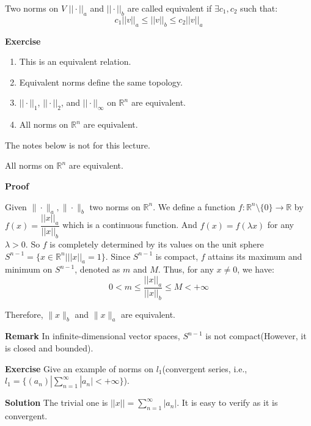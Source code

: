 \documentclass[main.tex]{subfiles}
\begin{document}
\begin{definition}
    Two norms on $V$ $||\cdot||_a$ and $||\cdot||_b$ are called equivalent if $\exists c_1, c_2$ such that:
    \begin{equation}
        c_1 ||v||_a \leq ||v||_b \leq c_2 ||v||_a
    \end{equation}
\end{definition}

\par \noindent \textbf{Exercise} 
\begin{enumerate}
    \item This is an equivalent relation.
    \item Equivalent norms define the same topology. 
    \item $||\cdot||_1$, $||\cdot||_2$, and $||\cdot||_\infty$ on $\mathbb{R}^n$ are equivalent.
    \item [*] All norms on $\mathbb{R}^n $ are equivalent. 
\end{enumerate}

\par The notes below is not for this lecture. 

\begin{theorem}
    All norms on $\mathbb{R}^n$ are equivalent. 
\end{theorem}
\par \noindent \textbf{Proof} 
\par Given $\|\cdot\|_a, \|\cdot\|_b$ two norms on $\mathbb{R}^n$. We define a function $f: \mathbb{R}^n \setminus \{0\} \rightarrow \mathbb{R}$ by $f(x) = \dfrac{||x||_a}{||x||_b}$ which is a continuous function. And $f(x) = f(\lambda x)$ for any $\lambda > 0$. So $f$ is completely determined by its values on the unit sphere $S^{n-1} = \{x \in \mathbb{R}^n | ||x||_a = 1\}$. Since $S^{n-1}$ is compact, $f$ attains its maximum and minimum on $S^{n-1}$, denoted as $m$ and $M$. Thus, for any $x \neq 0$, we have:
\begin{equation}
    0 < m \leq \dfrac{||x||_a}{||x||_b} \leq M < +\infty
\end{equation}
\par Therefore, $\|x\|_b$ and $\|x\|_a$ are equivalent. 

\par \noindent \textbf{Remark} In infinite-dimensional vector spaces, $S^{n-1}$ is not compact(However, it is closed and bounded). 

\par \noindent \textbf{Exercise} Give an example of norms on $l_1$(convergent series, i.e., $l_1 = \{(a_n) | \sum_{n=1}^{\infty} |a_n| < +\infty\}$).
\par \noindent \textbf{Solution} The trivial one is $||x|| = \sum_{n=1}^{\infty} |a_n|$. It is easy to verify as it is convergent. 
\end{document}
